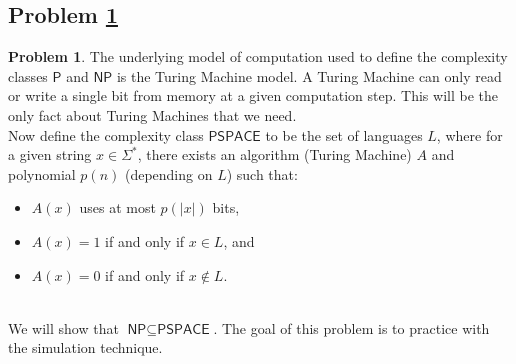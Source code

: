 \documentclass[11pt]{article}
\theoremstyle{definition}
\theoremstyle{definition}
\newtheorem{required}{Problem}
\theoremstyle{definition}
\begin{document}
\newpage
\subsection{Problem \ref{S30Prob3}}

\begin{required} \label{S30Prob3}
The underlying model of computation used to define the complexity classes $\textsf{P}$ and $\textsf{NP}$ is the Turing Machine model. A Turing Machine can only read or write a single bit from memory at a given computation step. This will be the only fact about Turing Machines that we need. \\

\noindent Now define the complexity class $\textsf{PSPACE}$ to be the set of languages $L$, where for a given string $x \in \Sigma^{*}$, there exists an algorithm (Turing Machine) $A$ and polynomial $p(n)$ (depending on $L$) such that:
\begin{itemize}
\item $A(x)$ uses at most $p(|x|)$ bits,
\item $A(x) = 1$ if and only if $x \in L$, and
\item $A(x) = 0$ if and only if $x \not \in L$.
\end{itemize}

\noindent \\ We will show that $\textsf{NP} \subseteq \textsf{PSPACE}$. The goal of this problem is to practice with the simulation technique.
\end{required}
\end{document}
